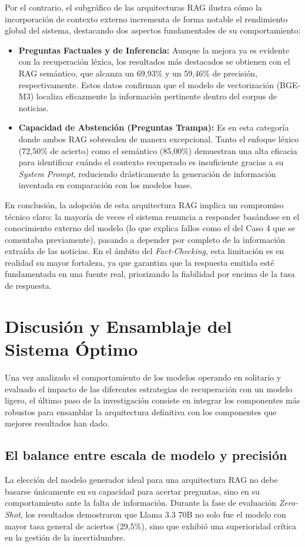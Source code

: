 Por el contrario, el subgráfico de las arquitecturas RAG ilustra cómo la incorporación de contexto externo incrementa de forma notable el rendimiento global del sistema, destacando dos aspectos fundamentales de su comportamiento:

\begin{itemize}
    \item \textbf{Preguntas Factuales y de Inferencia:} Aunque la mejora ya es evidente con la recuperación léxica, los resultados más destacados se obtienen con el RAG semántico, que alcanza un 69,93\% y un 59,46\% de precisión, respectivamente. Estos datos confirman que el modelo de vectorización (BGE-M3) localiza eficazmente la información pertinente dentro del corpus de noticias.
    \item \textbf{Capacidad de Abstención (Preguntas Trampa):} Es en esta categoría donde ambos RAG sobresalen de manera excepcional. Tanto el enfoque léxico (72,50\% de acierto) como el semántico (85,00\%) demuestran una alta eficacia para identificar cuándo el contexto recuperado es insuficiente gracias a su \textit{System Prompt}, reduciendo drásticamente la generación de información inventada en comparación con los modelos base.
\end{itemize}

En conclusión, la adopción de esta arquitectura RAG implica un compromiso técnico claro: la mayoría de veces el sistema renuncia a responder basándose en el conocimiento externo del modelo (lo que explica fallos como el del Caso 4 que se comentaba previamente), pasando a depender por completo de la información extraída de las noticias. En el ámbito del \textit{Fact-Checking}, esta limitación es en realidad su mayor fortaleza, ya que garantiza que la respuesta emitida esté fundamentada en una fuente real, priorizando la fiabilidad por encima de la tasa de respuesta.
\newpage
\section{Discusión y Ensamblaje del Sistema Óptimo}

Una vez analizado el comportamiento de los modelos operando en solitario y evaluado el impacto de las diferentes estrategias de recuperación con un modelo ligero, el último paso de la investigación consiste en integrar los componentes más robustos para ensamblar la arquitectura definitiva con los componentes que mejores resultados han dado.

\subsection{El balance entre escala de modelo y precisión}
\label{sec:balance_escala}
La elección del modelo generador ideal para una arquitectura RAG no debe basarse únicamente en su capacidad para acertar preguntas, sino en su comportamiento ante la falta de información. Durante la fase de evaluación \textit{Zero-Shot}, los resultados demostraron que Llama 3.3 70B no solo fue el modelo con mayor tasa general de aciertos (29,5\%), sino que exhibió una superioridad crítica en la gestión de la incertidumbre.

